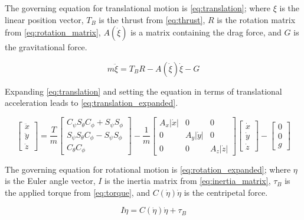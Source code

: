 \documentclass[letterpaper,12pt,titlepage,oneside,final]{book}
\begin{document}
The governing equation for translational motion is \eqref{eq:translation}; where $\xi$ is the linear position vector, $T_{B}$ is the thrust from \eqref{eq:thrust}, $R$ is the rotation matrix from \eqref{eq:rotation_matrix}, $A(\dot{\xi})$ is a matrix containing the drag force, and $G$ is the gravitational force.

\begin{equation} \label{eq:translation}
m\ddot{\xi} = T_{B}R - A(\dot{\xi})\dot{\xi} - G
\end{equation}

Expanding \eqref{eq:translation} and setting the equation in terms of translational acceleration leads to \eqref{eq:translation_expanded}.

\begin{equation} \label{eq:translation_expanded}
\begin{bmatrix}
\ddot{x} \\
\ddot{y} \\
\ddot{z}
\end{bmatrix} 
=
\dfrac{T}{m}
\begin{bmatrix}
C_{\psi}S_{\theta}C_{\phi} + S_{\psi}S_{\phi} \\
S_{\psi}S_{\theta}C_{\phi} - S_{\psi}S_{\phi} \\
C_{\theta}C_{\phi}
\end{bmatrix}
-
\dfrac{1}{m}
\begin{bmatrix}
A_{x}|\dot{x}| & 0 & 0 \\
0 & A_{y}|\dot{y}| & 0 \\
0 & 0 & A_{z}|\dot{z}|
\end{bmatrix}
\begin{bmatrix}
\dot{x} \\
\dot{y} \\
\dot{z}
\end{bmatrix}
-
\begin{bmatrix}
0 \\
0 \\
g
\end{bmatrix}
\end{equation}

The governing equation for rotational motion is \eqref{eq:rotation_expanded}; where $\eta$ is the Euler angle vector, $I$ is the inertia matrix from \eqref{eq:inertia_matrix}, $\tau_{B}$ is the applied torque from \eqref{eq:torque}, and $C(\dot{\eta})\dot{\eta}$ is the centripetal force. 

\begin{equation} \label{eq:rotation}
I\ddot{\eta} = C(\dot{\eta})\dot{\eta} + \tau_{B}
\end{equation}
\end{document}
